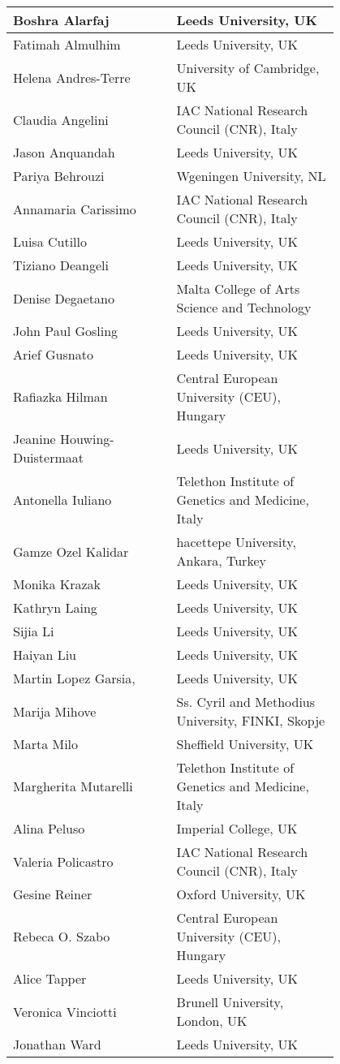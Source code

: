 \begin{center}
\begin{longtable}{p{0.4\linewidth} p{0.4\linewidth} }
\hline


Boshra	Alarfaj &	Leeds University, UK  \\ \hline
Fatimah	Almulhim	& Leeds University, UK  \\ \hline
Helena	Andres-Terre	& University of Cambridge, UK  \\ \hline
Claudia	Angelini &	IAC National Research Council (CNR), Italy  \\ \hline
Jason	Anquandah &	Leeds University, UK  \\ \hline
Pariya	Behrouzi	& Wgeningen University, NL  \\ \hline
Annamaria	Carissimo	& IAC National Research Council (CNR), Italy  \\ \hline
Luisa	Cutillo &	Leeds University, UK  \\ \hline
Tiziano	Deangeli	& Leeds University, UK  \\ \hline
Denise	Degaetano &	Malta College of Arts Science and Technology  \\ \hline
John Paul	Gosling	& Leeds University, UK  \\ \hline
Arief	Gusnato	& Leeds University, UK  \\ \hline
 Rafiazka	Hilman	& Central European University (CEU), Hungary  \\ \hline
Jeanine	Houwing-Duistermaat	& Leeds University, UK  \\ \hline
Antonella	Iuliano &	Telethon Institute of Genetics and Medicine, Italy  \\ \hline
Gamze Ozel	Kalidar	& hacettepe University, Ankara, Turkey  \\ \hline
Monika	Krazak	& Leeds University, UK  \\ \hline
Kathryn	Laing &	Leeds University, UK  \\ \hline
Sijia	Li &	Leeds University, UK  \\ \hline
Haiyan Liu & Leeds University, UK  \\ \hline
Martin Lopez Garsia, & Leeds University, UK  \\ \hline
Marija	Mihove	& Ss. Cyril and Methodius University, FINKI, Skopje  \\ \hline
Marta	Milo	& Sheffield University, UK  \\ \hline
Margherita	Mutarelli	& Telethon Institute of Genetics and Medicine, Italy  \\ \hline
Alina	Peluso &	Imperial College, UK  \\ \hline
Valeria	Policastro &	IAC  National Research Council (CNR), Italy  \\ \hline
Gesine	Reiner	& Oxford University, UK  \\ \hline
Rebeca O.	Szabo & Central European University (CEU), Hungary  \\ \hline
Alice	Tapper &	Leeds University, UK  \\ \hline
Veronica	Vinciotti	& Brunell University, London, UK  \\ \hline
Jonathan	Ward	& Leeds University, UK  \\ \hline



\end{longtable}
\end{center}
